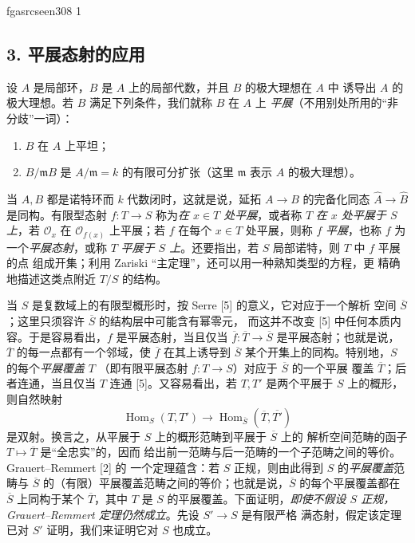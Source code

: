 \documentclass[12pt,twoside,openany]{book}
\numberwithin{equation}{section}
\newcommand{\fgaunitid}{unbound}
\newcommand{\src}[1]{%
  \phantomsection
  \hypertarget{src:\fgaunitid:#1}{}%
  \hypertarget{fga.\fgaunitid.p#1}{}%
  \ifcsname fgasrcseen#1\endcsname\else
    \expandafter\gdef\csname fgasrcseen#1\endcsname{1}%
    \hypertarget{src:#1}{}%
  \fi
  \marginpar{\raggedleft\footnotesize\sffamily #1}%
}
\newcommand{\fquote}[1]{“#1”}
\theoremstyle{plain}
\theoremstyle{definition}
\theoremstyle{remark}
\begin{document}
\src{308}
\subsection*{3. 平展态射的应用}

设 $A$ 是局部环，$B$ 是 $A$ 上的局部代数，并且 $B$ 的极大理想在 $A$ 中
诱导出 $A$ 的极大理想。若 $B$ 满足下列条件，我们就称 $B$ 在 $A$ 上
\emph{平展}（不用别处所用的\fquote{非分歧}一词）：
\begin{enumerate}
\item[(i)] $B$ 在 $A$ 上平坦；
\item[(ii)] $B/\mathfrak mB$ 是 $A/\mathfrak m=k$ 的有限可分扩张（这里
$\mathfrak m$ 表示 $A$ 的极大理想）。
\end{enumerate}
当 $A,B$ 都是诺特环而 $k$ 代数闭时，这就是说，延拓
$A\longrightarrow B$ 的完备化同态
$\widehat A\longrightarrow\widehat B$ 是同构。有限型态射
$f:T\longrightarrow S$ 称为\emph{在 $x\in T$ 处平展}，或者称 $T$
\emph{在 $x$ 处平展于 $S$ 上}，若 $\mathcal O_x$ 在
$\mathcal O_{f(x)}$ 上平展；若 $f$ 在每个 $x\in T$ 处平展，则称 $f$
\emph{平展}，也称 $f$ 为一个\emph{平展态射}，或称 $T$
\emph{平展于 $S$ 上}。还要指出，若 $S$ 局部诺特，则 $T$ 中 $f$ 平展的点
组成开集；利用 Zariski \fquote{主定理}，还可以用一种熟知类型的方程，更
精确地描述这类点附近 $T/S$ 的结构。

当 $S$ 是复数域上的有限型概形时，按 Serre [5] 的意义，它对应于一个解析
空间 $\overline S$；这里只须容许 $\overline S$ 的结构层中可能含有幂零元，
而这并不改变 [5] 中任何本质内容。于是容易看出，$f$ 是平展态射，当且仅当
$\overline f:\overline T\longrightarrow\overline S$ 是平展态射；也就是说，
$\overline T$ 的每一点都有一个邻域，使 $\overline f$ 在其上诱导到
$\overline S$ 某个开集上的同构。特别地，$S$ 的每个\emph{平展覆盖} $T$
（即有限平展态射 $f:T\longrightarrow S$）对应于 $\overline S$ 的一个平展
覆盖 $\overline T$；后者连通，当且仅当 $T$ 连通 [5]。又容易看出，若
$T,T'$ 是两个平展于 $S$ 上的概形，则自然映射
\[
  \operatorname{Hom}_S(T,T')\longrightarrow
  \operatorname{Hom}_{\overline S}(\overline T,\overline{T'})
\]
是双射。换言之，从平展于 $S$ 上的概形范畴到平展于 $\overline S$ 上的
解析空间范畴的函子 $T\longmapsto\overline T$ 是\fquote{全忠实}的，因而
给出前一范畴与后一范畴的一个子范畴之间的等价。Grauert--Remmert [2] 的
一个定理蕴含：若 $S$ 正规，则由此得到 $S$ 的\emph{平展覆盖}范畴与
$\overline S$ 的（有限）平展覆盖范畴之间的等价；也就是说，$\overline S$
的每个平展覆盖都在 $\overline S$ 上同构于某个 $\overline T$，其中 $T$
是 $S$ 的平展覆盖。下面证明，\emph{即使不假设 $S$ 正规，
Grauert--Remmert 定理仍然成立}。先设 $S'\longrightarrow S$ 是有限严格
满态射，假定该定理已对 $S'$ 证明，我们来证明它对 $S$ 也成立。
\end{document}
